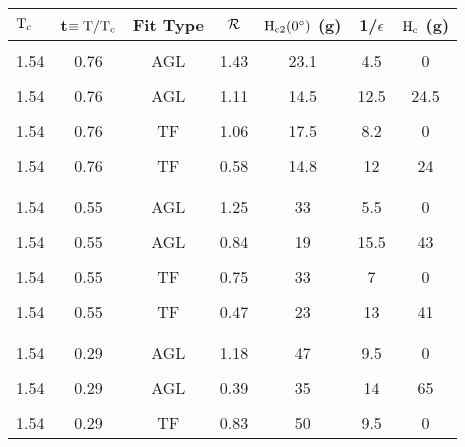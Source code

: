 \pagestyle{empty}

\begin{table}
\label{residsum}
\begin{center}
\begin{tabular}{|l|cccccc|}
\hline
$\rm T_c$ & t$\rm \equiv T/T_c$ & Fit Type & $\cal R$ & $\rm H_{c2}(0^{\circ})$ (g)& 1/$\epsilon$ & $\rm H_c$ (g) \\
\hline
& & & & & & \\
1.54 &  0.76 & AGL &1.43 & 23.1 & 4.5 & 0 \\ 
& & & & & & \\
1.54 &  0.76 & AGL &1.11 & 14.5   & 12.5& 24.5 \\
& & & & & & \\
1.54 &  0.76 &  TF & 1.06 & 17.5   & 8.2 & 0 \\
& & & & & & \\
1.54 &  0.76 &  TF & 0.58 & 14.8   & 12& 24 \\
& & & & & & \\
\hline
& & & & & & \\
1.54 & 0.55 &AGL & 1.25 & 33 & 5.5 & 0 \\
& & & & & & \\
1.54 & 0.55 &AGL & 0.84 & 19 & 15.5  & 43 \\
& & & & & & \\
1.54 & 0.55 &TF  & 0.75 & 33 &  7  &  0 \\
& & & & & & \\
1.54 & 0.55 &TF  & 0.47 & 23 & 13  & 41 \\
& & & & & & \\
\hline
& & & & & & \\
1.54 & 0.29 &AGL & 1.18 & 47 & 9.5  & 0 \\
& & & & & & \\
1.54 & 0.29 &AGL & 0.39 & 35 & 14  & 65 \\
& & & & & & \\
1.54 & 0.29 &TF  & 0.83 & 50 & 9.5  & 0 \\

\end{tabular}
\end{center}
\end{table}

